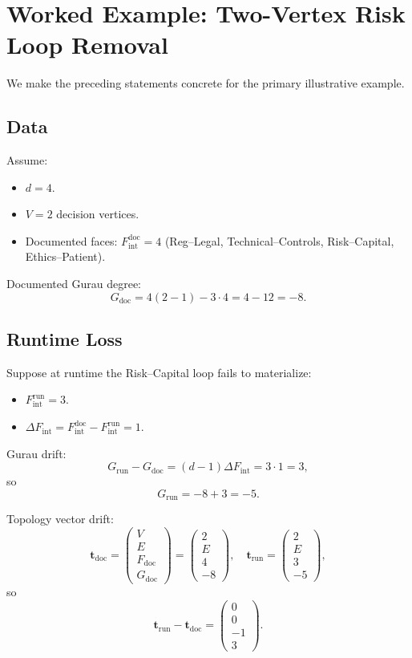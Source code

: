 \documentclass[11pt]{article}
\begin{document}
\section{Worked Example: Two-Vertex Risk Loop Removal}

We make the preceding statements concrete for the primary illustrative example.

\subsection{Data}

Assume:
\begin{itemize}
  \item \(d = 4\).
  \item \(V = 2\) decision vertices.
  \item Documented faces: \(F_{\mathrm{int}}^{\mathrm{doc}} = 4\) (Reg–Legal, Technical–Controls, Risk–Capital, Ethics–Patient).
\end{itemize}

Documented Gurau degree:
\[
G_{\mathrm{doc}} = 4(2 - 1) - 3\cdot 4 = 4 - 12 = -8.
\]

\subsection{Runtime Loss}

Suppose at runtime the Risk–Capital loop fails to materialize:
\begin{itemize}
  \item \(F_{\mathrm{int}}^{\mathrm{run}} = 3\).
  \item \(\Delta F_{\mathrm{int}} = F_{\mathrm{int}}^{\mathrm{doc}} - F_{\mathrm{int}}^{\mathrm{run}} = 1.\)
\end{itemize}

Gurau drift:
\[
G_{\mathrm{run}} - G_{\mathrm{doc}} = (d-1)\Delta F_{\mathrm{int}} = 3\cdot 1 = 3,
\]
so
\[
G_{\mathrm{run}} = -8 + 3 = -5.
\]

Topology vector drift:
\[
\mathbf{t}_{\mathrm{doc}} =
\begin{pmatrix}
V\\E\\F_{\mathrm{doc}}\\G_{\mathrm{doc}}
\end{pmatrix}
=
\begin{pmatrix}
2\\E\\4\\-8
\end{pmatrix},\quad
\mathbf{t}_{\mathrm{run}} =
\begin{pmatrix}
2\\E\\3\\-5
\end{pmatrix},
\]
so
\[
\mathbf{t}_{\mathrm{run}} - \mathbf{t}_{\mathrm{doc}} =
\begin{pmatrix}
0\\0\\-1\\3
\end{pmatrix}.
\]
\end{document}
